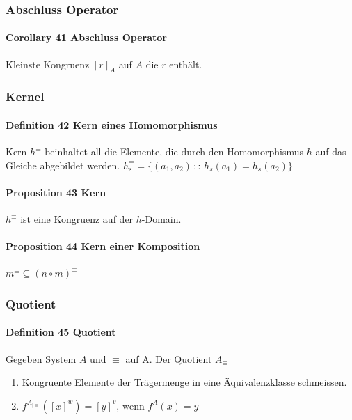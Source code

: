 \subsubsection{Abschluss Operator}

\paragraph{Corollary 41 Abschluss Operator}
Kleinste Kongruenz $\left\lceil r\right\rceil _{A}$ auf
$A$ die $r$ enthält.

\subsubsection{Kernel}

\paragraph{Definition 42 Kern eines Homomorphismus}
Kern $h^\equiv$ beinhaltet all die Elemente, die durch den Homomorphismus $h$ auf das Gleiche abgebildet werden.
$h_{s}^{\equiv}=\{(a_{1},a_{2})\,::\, h_{s}(a_{1})=h_{s}(a_{2})\}$

\paragraph{Proposition 43 Kern}
$h^\equiv$ ist eine Kongruenz auf der $h$-Domain.

\paragraph{Proposition 44 Kern einer Komposition}
$m^\equiv \subseteq (n \circ m)^\equiv$ 


\subsubsection{Quotient}

\paragraph{Definition 45 Quotient}
Gegeben System $A$ und $\equiv$ auf A. Der Quotient $A_\equiv$ 
\begin{enumerate}
\item Kongruente Elemente der Trägermenge in eine Äquivalenzklasse schmeissen.
\item $f^{A_{|\equiv}}([x]^{w})=[y]^{v},\,\textrm{wenn }f^{A}(x)=y$
\end{enumerate}

